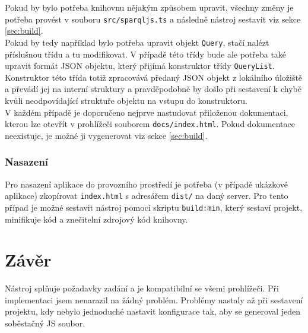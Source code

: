 \documentclass[
12pt,
a4paper,
pdftex,
czech,
titlepage
]{article}
\begin{document}
Pokud by bylo potřeba knihovnu nějakým způsobem upravit, všechny změny je potřeba provést v souboru \texttt{src/sparqljs.ts} a následně nástroj sestavit viz sekce \ref{sec:build}.\\

Pokud by tedy například bylo potřeba upravit objekt \texttt{Query}, stačí nalézt příslušnou třídu a tu modifikovat. V případě této třídy bude ale potřeba také upravit formát JSON objektu, který přijímá konstruktor třídy \texttt{QueryList}. Konstruktor této třída totiž zpracovává předaný JSON objekt z lokálního úložiště a převádí jej na interní struktury a pravděpodobně by došlo při sestavení k chybě kvůli neodpovídající struktuře objektu na vstupu do konstruktoru. \\

V každém případě je doporučeno nejprve nastudovat přiloženou dokumentaci, kterou lze otevřít v prohlížeči souborem \texttt{docs/index.html}. Pokud dokumentace neexistuje, je možné ji vygenerovat viz sekce \ref{sec:build}. 

\subsubsection{Nasazení}

Pro nasazení aplikace do provozního prostředí je potřeba (v případě ukázkové aplikace) zkopírovat \texttt{index.html} s adresářem \texttt{dist/} na daný server. Pro tento případ je možné sestavit nástroj pomocí skriptu \texttt{build:min}, který sestaví projekt, minifikuje kód a znečitelní zdrojový kód knihovny.

\section{Závěr}

Nástroj splňuje požadavky zadání a je kompatibilní se všemi prohlížeči. Při implementaci jsem nenarazil na žádný problém. Problémy nastaly až při sestavení projektu, kdy nebylo jednoduché nastavit konfigurace tak, aby se generoval jeden soběstačný JS soubor.
\end{document}
